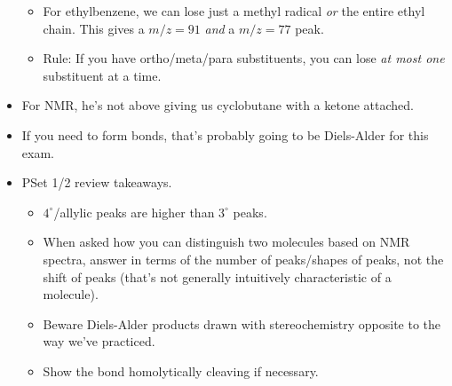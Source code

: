 \documentclass[../notes.tex]{subfiles}
\begin{document}
\begin{itemize}
\begin{itemize}
        \item For ethylbenzene, we can lose just a methyl radical \emph{or} the entire ethyl chain. This gives a $m/z=91$ \emph{and} a $m/z=77$ peak.
        \item Rule: If you have ortho/meta/para substituents, you can lose \emph{at most one} substituent at a time.
    \end{itemize}
    \item For  NMR, he's not above giving us cyclobutane with a ketone attached.
    \item If you need to form  bonds, that's probably going to be Diels-Alder for this exam.
    \item {}PSet 1/2 review takeaways.
    \begin{itemize}
        \item $4^\circ$/allylic  peaks are higher than $3^\circ$ peaks.
        \item When asked how you can distinguish two molecules based on NMR spectra, answer in terms of the number of peaks/shapes of peaks, not the shift of peaks (that's not generally intuitively characteristic of a molecule).
        \item Beware Diels-Alder products drawn with stereochemistry opposite to the way we've practiced.
        \item Show the  bond homolytically cleaving if necessary.
    \end{itemize}
\end{itemize}
\newpage
\end{document}
